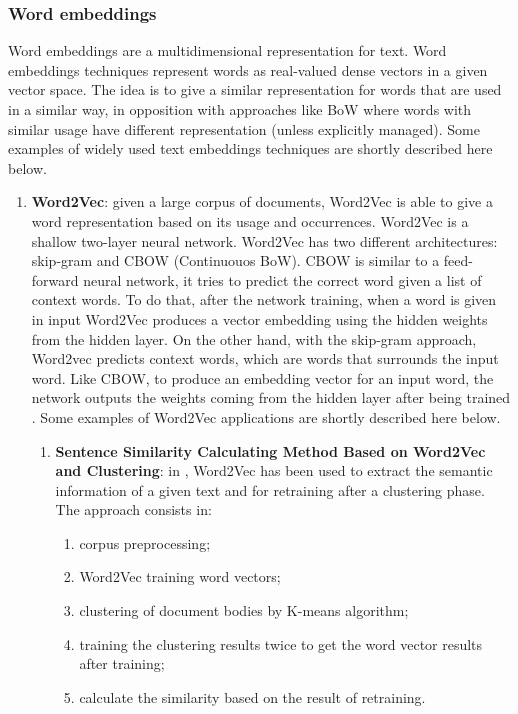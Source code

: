 \documentclass[\main/main.tex]{subfiles}
\begin{document}
\subsubsection{Word embeddings}
Word embeddings are a multidimensional representation for text. Word embeddings techniques represent words as real-valued dense vectors in a given vector space. The idea is to give a similar representation for words that are used in a similar way, in opposition with approaches like BoW where words with similar usage have different representation (unless explicitly managed). Some examples of widely used text embeddings techniques are shortly described here below.
\begin{enumerate}
    \item \textbf{Word2Vec}: given a large corpus of documents, Word2Vec is able to give a word representation based on its usage and occurrences. Word2Vec is a shallow two-layer neural network. Word2Vec has two different architectures: skip-gram and CBOW (Continuouos BoW). CBOW is similar to a feed-forward neural network, it tries to predict the correct word given a list of context words. To do that, after the network training, when a word is given in input Word2Vec produces a vector embedding using the hidden weights from the hidden layer. On the other hand, with the skip-gram approach, Word2vec predicts context words, which are words that surrounds the input word. Like CBOW, to produce an embedding vector for an input word, the network outputs the weights coming from the hidden layer after being trained \cite{mikolov2013efficient}. Some examples of Word2Vec applications are shortly described here below.
    \begin{enumerate}
        \item \textbf{Sentence Similarity Calculating Method Based on Word2Vec and Clustering}: in \cite{Song2020SentenceSC}, Word2Vec has been used to extract the semantic information of a given text and for retraining after a clustering phase. The approach consists in: 
        \begin{enumerate}
            \item corpus preprocessing;
            \item Word2Vec training word vectors;
            \item clustering of document bodies by K-means algorithm;
            \item training the clustering results twice to get the word vector results after training;
            \item calculate the similarity based on the result of retraining.

\end{enumerate}
\end{enumerate}
\end{enumerate}
\end{document}
